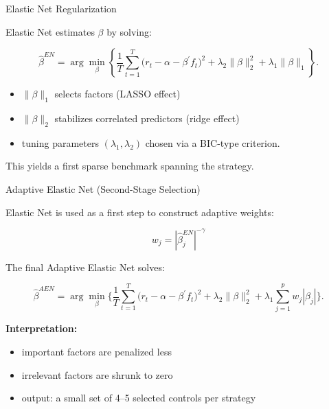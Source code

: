 \documentclass[aspectratio=169,11pt]{beamer}
\begin{document}
\begin{frame}{Elastic Net Regularization}
\small

Elastic Net estimates $\beta$ by solving:

\[
\hat{\beta}^{EN}
=
\arg\min_{\beta}
\left\{
\frac{1}{T}\sum_{t=1}^{T}\bigl(r_t-\alpha-\beta^{\prime}f_t\bigr)^2
+\lambda_2\|\beta\|_2^2
+\lambda_1\|\beta\|_1
\right\}.
\]

\vspace{0.3cm}

\begin{itemize}
    \item $\|\beta\|_1$ selects factors (LASSO effect)
    \item $\|\beta\|_2$ stabilizes correlated predictors (ridge effect)
    \item tuning parameters $(\lambda_1,\lambda_2)$ chosen via a BIC-type criterion.
\end{itemize}

\vspace{0.3cm}

This yields a first sparse benchmark spanning the strategy.

\end{frame}

\begin{frame}{Adaptive Elastic Net (Second-Stage Selection)}
\small

Elastic Net is used as a first step to construct adaptive weights:

\[
w_j = \left|\hat{\beta}^{EN}_j\right|^{-\gamma}
\]


\vspace{0.3cm}

The final Adaptive Elastic Net solves:

\[
\hat{\beta}^{AEN}
=
\arg\min_{\beta}
\Biggl\{
\frac{1}{T}\sum_{t=1}^{T}
\bigl(r_t-\alpha-\beta^{\prime}f_t\bigr)^2
+\lambda_2\|\beta\|_2^2
+\lambda_1\sum_{j=1}^{p} w_j|\beta_j|
\Biggr\}.
\]

\vspace{0.3cm}

\textbf{Interpretation:}

\begin{itemize}
    \item important factors are penalized less
    \item irrelevant factors are shrunk to zero
    \item output: a small set of 4--5 selected controls per strategy
\end{itemize}

\end{frame}
\end{document}
